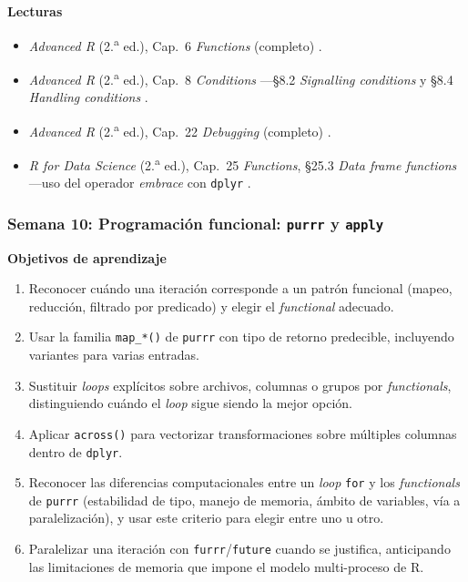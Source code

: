 \documentclass[11pt,letterpaper]{article}
\newcommand{\semana}[2]{%
  \subsubsection*{\color{main}Semana #1: #2}%
}
\begin{document}
\medskip
\noindent\textbf{Lecturas}
\begin{itemize}[leftmargin=*, itemsep=1pt]
    \item \textit{Advanced R} (2.\textsuperscript{a} ed.), Cap.\ 6 \textit{Functions} (completo) \cite{wickham2019advr}.
    \item \textit{Advanced R} (2.\textsuperscript{a} ed.), Cap.\ 8 \textit{Conditions} ---§8.2 \textit{Signalling conditions} y §8.4 \textit{Handling conditions} \cite{wickham2019advr}.
    \item \textit{Advanced R} (2.\textsuperscript{a} ed.), Cap.\ 22 \textit{Debugging} (completo) \cite{wickham2019advr}.
    \item \textit{R for Data Science} (2.\textsuperscript{a} ed.), Cap.\ 25 \textit{Functions}, §25.3 \textit{Data frame functions} ---uso del operador \textit{embrace} con \texttt{dplyr} \cite{wickham2023r4ds}.
\end{itemize}

\semana{10}{Programación funcional: \texttt{purrr} y \texttt{apply}}

\medskip
\noindent\textbf{Objetivos de aprendizaje}
\begin{enumerate}[leftmargin=*, itemsep=1pt]
    \item Reconocer cuándo una iteración corresponde a un patrón funcional (mapeo, reducción, filtrado por predicado) y elegir el \textit{functional} adecuado.
    \item Usar la familia \texttt{map\_*()} de \texttt{purrr} con tipo de retorno predecible, incluyendo variantes para varias entradas.
    \item Sustituir \textit{loops} explícitos sobre archivos, columnas o grupos por \textit{functionals}, distinguiendo cuándo el \textit{loop} sigue siendo la mejor opción.
    \item Aplicar \texttt{across()} para vectorizar transformaciones sobre múltiples columnas dentro de \texttt{dplyr}.
    \item Reconocer las diferencias computacionales entre un \textit{loop} \texttt{for} y los \textit{functionals} de \texttt{purrr} (estabilidad de tipo, manejo de memoria, ámbito de variables, vía a paralelización), y usar este criterio para elegir entre uno u otro.
    \item Paralelizar una iteración con \texttt{furrr}/\texttt{future} cuando se justifica, anticipando las limitaciones de memoria que impone el modelo multi-proceso de R.
\end{enumerate}
\end{document}
